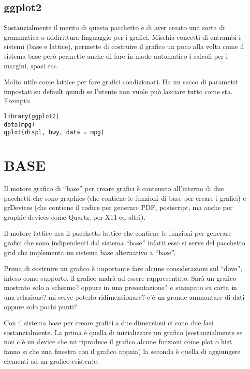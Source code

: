 \subsection{ggplot2}

Sostanzialmente il merito di questo pacchetto è di aver creato una sorta di grammatica o addirittura linguaggio per i grafici. Mischia concetti di entrambi i sistemi (base e lattice), permette di costruire il grafico un poco alla volta come il sistema base però permette anche di fare in modo automatico i calcoli per i margini, spazi ecc.

Molto utile come lattice per fare grafici condizionati. Ha un sacco di parametri impostati su default quindi se l'utente non vuole può lasciare tutto come sta. Esempio:
\begin{lstlisting}
library(ggplot2)
data(mpg)
qplot(displ, hwy, data = mpg)
\end{lstlisting} 


\section{BASE}

Il motore grafico di ``base'' per creare grafici è contenuto all'interno di due pacchetti che sono graphics (che contiene le funzioni di base per creare i grafici) e grDevices (che contiene il codice per generare PDF, postscript, ma anche per graphic devices come Quartz, per X11 ed altri).

Il motore lattice usa il pacchetto lattice che contiene le funzioni per generare grafici che sono indipendenti dal sistema ``base'' infatti esso si serve del pacchetto \textsf{grid} che implementa un sistema base alternativo a ``base''.

Prima di costruire un grafico è importante fare alcune considerazioni sul ``dove'', inteso come supporto, il grafico andrà ad essere rappresentato.  Sarà un grafico mostrato solo a schermo? oppure in una presentazione? o stampato su carta in una relazione? mi serve poterlo ridimensionare? c'è un grande ammontare di dati oppure solo pochi punti?

Con il sistema base per creare grafici a due dimensioni ci sono due fasi sostanzialmente. La prima è quella di inizializzare un grafico (sostanzialmente se non c'è un device che mi riproduce il grafico alcune funzioni come plot o hist fanno si che una finestra con il grafico appaia) la seconda è quella di aggiungere elementi ad un grafico esistente.

